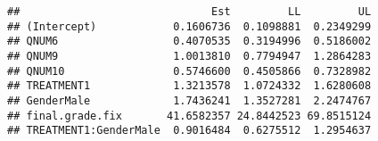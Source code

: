 \documentclass[]{article}
\begin{document}
\begin{verbatim}
##                              Est         LL         UL
## (Intercept)            0.1606736  0.1098881  0.2349299
## QNUM6                  0.4070535  0.3194996  0.5186002
## QNUM9                  1.0013810  0.7794947  1.2864283
## QNUM10                 0.5746600  0.4505866  0.7328982
## TREATMENT1             1.3213578  1.0724332  1.6280608
## GenderMale             1.7436241  1.3527281  2.2474767
## final.grade.fix       41.6582357 24.8442523 69.8515124
## TREATMENT1:GenderMale  0.9016484  0.6275512  1.2954637
\end{verbatim}
\end{document}
